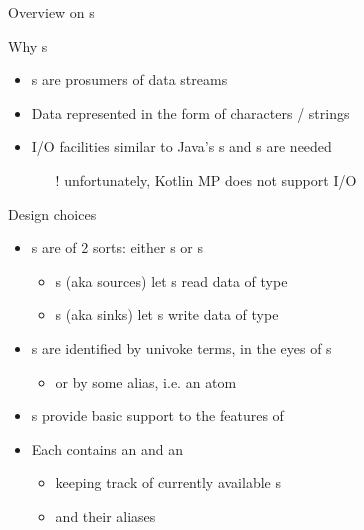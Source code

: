 \documentclass[handout]{beamer}
\begin{document}
\begin{frame}[allowframebreaks]{Overview on s}
    \begin{block}{Why s}
        \begin{itemize}
            \item {}s are \alert{prosumers} of data \alert{streams}
            \item Data represented in the form of \alert{characters} / \alert{strings}
            \item I/O facilities similar to Java's s and s are needed
            \begin{itemize}
                \item[!] unfortunately, Kotlin MP does not support I/O
            \end{itemize}
        \end{itemize}
    \end{block}

    \begin{block}{Design choices}
        \begin{itemize}
            \item {}s are of 2 sorts: either s or s
            \begin{itemize}
                \item {}s (aka \alert{sources}) let s read data of type 
                \item {}s (aka \alert{sinks}) let s write data of type 
            \end{itemize}
            \item {}s are identified by univoke terms, in the eyes of s
            \begin{itemize}
                \item or by some \alert{alias}, i.e. an \alert{atom}
            \end{itemize}
            \item {}s provide basic support to the features of 
            \item Each  contains an  and an 
            \begin{itemize}
                \item keeping track of currently available s
                \item and their aliases
            \end{itemize}
        \end{itemize}
    \end{block}


\end{frame}
\end{document}
